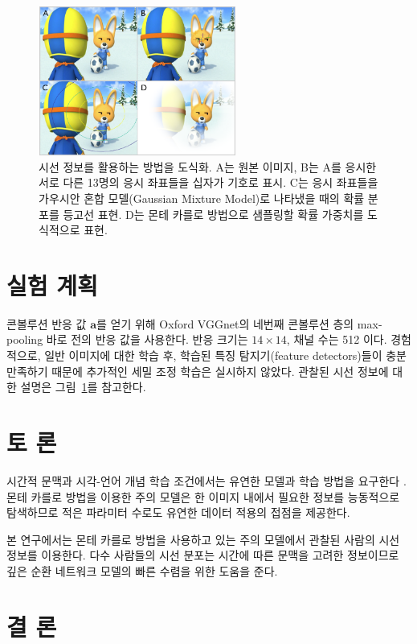 \documentclass{kcc}
\newcommand{\sa}[0]{\mathbf{a}}
\begin{document}
\begin{figure}
  \centerline{\includegraphics[width=65mm,height=49mm]{eps/sel_fig2.png}}
  \caption{시선 정보를 활용하는 방법을 도식화. A는 원본 이미지, B는 A를 응시한 서로 다른 13명의 응시 좌표들을 십자가 기호로 표시. C는 응시 좌표들을 가우시안 혼합 모델(Gaussian Mixture Model)로 나타냈을 때의 확률 분포를 등고선 표현. D는 몬테 카를로 방법으로 샘플링할 확률 가중치를 도식적으로 표현.}
  \label{fig:selective}
\end{figure}

\section{실험 계획}

콘볼루션 반응 값 $\sa$를 얻기 위해 Oxford VGGnet\cite{Simonyan2014}의 네번째 콘볼루션 층의 max-pooling 바로 전의 반응 값을 사용한다. 반응 크기는 $14 \times 14$, 채널 수는 512 이다. 경험적으로, 일반 이미지에 대한 학습 후, 학습된 특징 탐지기(feature detectors)들이 충분 만족하기 때문에 추가적인 세밀 조정 학습은 실시하지 않았다. 관찰된 시선 정보에 대한 설명은 그림~\ref{fig:selective}를 참고한다.

\section{토 론}

시간적 문맥과 시각-언어 개념 학습 조건에서는 유연한 모델과 학습 방법을 요구한다 \cite{zhang1994incremental}. 몬테 카를로 방법을 이용한 주의 모델은 한 이미지 내에서 필요한 정보를 능동적으로 탐색하므로 적은 파라미터 수로도 유연한 데이터 적용의 접점을 제공한다.

본 연구에서는 몬테 카를로 방법을 사용하고 있는 주의 모델에서 관찰된 사람의 시선 정보를 이용한다. 다수 사람들의 시선 분포는 시간에 따른 문맥을 고려한 정보이므로 깊은 순환 네트워크 모델의 빠른 수렴을 위한 도움을 준다.

\section{결 론}
\end{document}
